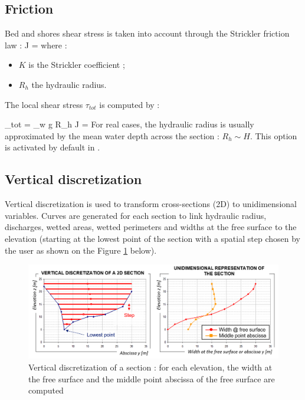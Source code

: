 \subsection{Friction}
Bed and shores shear stress is taken into account through the Strickler friction law :
\bequ
	J = 
	\label{eq:strickler}
\eequ
where :
\begin{itemize}
	\item $K$ is the Strickler coefficient ;
	\item $R_h$ the hydraulic radius.
\end{itemize}

The local shear stress $\tau_{tot}$ is computed by :

\bequ
	\tau_{tot} = \rho_w g R_h J = 
	\label{eq:contrainte_totale}
\eequ
For real cases, the hydraulic radius is usually approximated by the mean water depth across the section : $R_h \sim H$.
This option is activated by default in \courlis. 


\subsection{Vertical discretization}
\label{planim}

Vertical discretization is used to transform cross-sections (2D) to unidimensional variables. Curves are generated for each section to link hydraulic radius, discharges, wetted areas, wetted perimeters and widths at the free surface to the elevation (starting at the lowest point of the section with a spatial step chosen by the user as shown on the Figure \ref{fig:planimetrage} below). 

\begin{figure}[htb!]
    \centering
    \includegraphics[width=\textwidth]{./graphics/planimetrage.png}
    \caption{Vertical discretization of a section : for each elevation, the width at the free surface and the middle point abscissa of the free surface are computed}
    \label{fig:planimetrage}
\end{figure}

